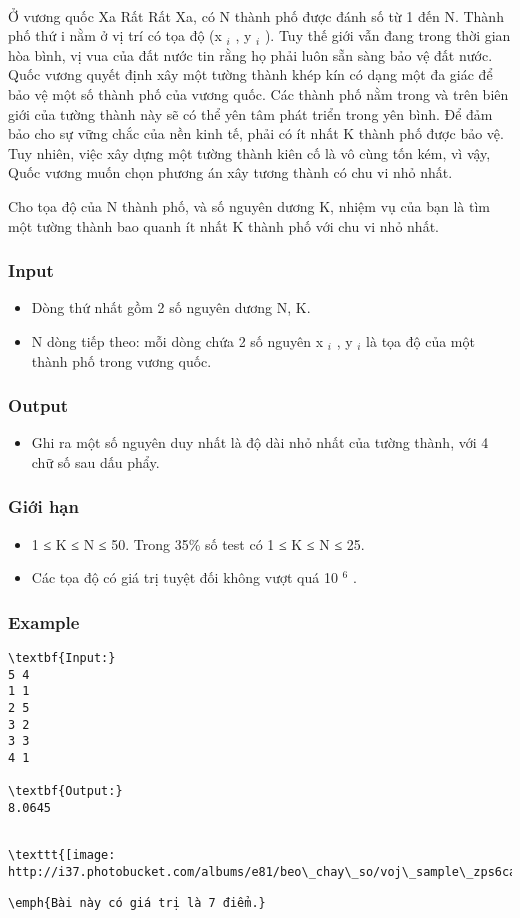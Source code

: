 

 

Ở vương quốc Xa Rất Rất Xa, có N thành phố được đánh số từ 1 đến N. Thành phố thứ i nằm ở vị trí có tọa độ (x $_ i $ , y $_ i $ ). Tuy thế giới vẫn đang trong thời gian hòa bình, vị vua của đất nước tin rằng họ phải luôn sẵn sàng bảo vệ đất nước. Quốc vương quyết định xây một tường thành khép kín có dạng một đa giác để bảo vệ một số thành phố của vương quốc. Các thành phố nằm trong và trên biên giới của tường thành này sẽ có thể yên tâm phát triển trong yên bình. Để đảm bảo cho sự vững chắc của nền kinh tế, phải có ít nhất K thành phố được bảo vệ. Tuy nhiên, việc xây dựng một tường thành kiên cố là vô cùng tốn kém, vì vậy, Quốc vương muốn chọn phương án xây tương thành có chu vi nhỏ nhất.

Cho tọa độ của N thành phố, và số nguyên dương K, nhiệm vụ của bạn là tìm một tường thành bao quanh ít nhất K thành phố với chu vi nhỏ nhất.

\subsubsection{Input}
\begin{itemize}
	\item Dòng thứ nhất gồm 2 số nguyên dương N, K.
	\item N dòng tiếp theo: mỗi dòng chứa 2 số nguyên x $_ i $ , y $_ i $ là tọa độ của một thành phố trong vương quốc.
\end{itemize}

\subsubsection{Output}
\begin{itemize}
	\item Ghi ra một số nguyên duy nhất là độ dài nhỏ nhất của tường thành, với 4 chữ số sau dấu phẩy.
\end{itemize}

\subsubsection{Giới hạn}
\begin{itemize}
	\item 1 ≤ K ≤ N ≤ 50. Trong 35\% số test có 1 ≤ K ≤ N ≤ 25.
	\item Các tọa độ có giá trị tuyệt đối không vượt quá 10 $^ 6 $ .
\end{itemize}

\subsubsection{Example}
\begin{verbatim}
\textbf{Input:}
5 4
1 1
2 5
3 2
3 3
4 1

\textbf{Output:}
8.0645
\end{verbatim}
\begin{verbatim}

\texttt{[image: http://i37.photobucket.com/albums/e81/beo\_chay\_so/voj\_sample\_zps6cadef14.png]}\end{verbatim}
\begin{verbatim}
\emph{Bài này có giá trị là 7 điểm.}\end{verbatim}